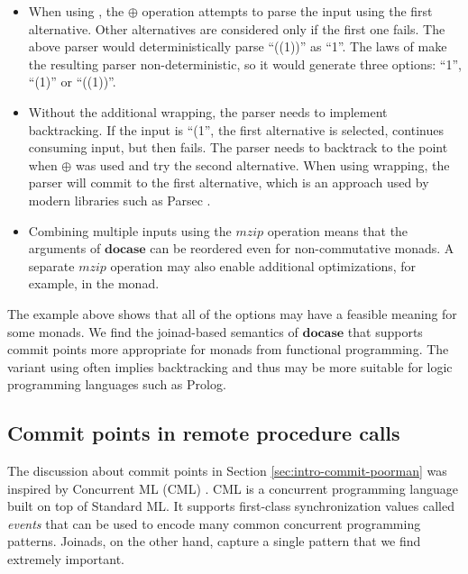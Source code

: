\documentclass{sigplanconf}
\newcommand{\Varid}[1]{\mathit{#1}}
\begin{document}
\begin{itemize}
\item When using , the \ensuremath{\oplus} operation attempts to parse the input using the
  first alternative. Other alternatives are considered only if the first one fails. The above parser 
  would deterministically parse ``((1))'' as ``1''. The laws of  make the resulting 
  parser non-deterministic, so it would generate three options: ``1'', ``(1)'' or ``((1))''.

\item Without the additional wrapping, the parser needs to implement backtracking. If the
  input is ``(1'', the first alternative is selected, continues consuming input, but then fails.
  The parser needs to backtrack to the point when \ensuremath{\oplus} was used and try the second alternative. 
  When using wrapping, the parser will commit to the first alternative, which is an approach used
  by modern libraries such as Parsec \cite{parsec}.

\item Combining multiple inputs using the \ensuremath{\Varid{mzip}} operation means that the arguments of \ensuremath{\mathbf{docase}}
  can be reordered even for non-commutative monads. A separate \ensuremath{\Varid{mzip}} operation may also enable 
  additional optimizations, for example, in the  monad.

\end{itemize}
The example above shows that all of the options may have a feasible meaning for some monads. We find 
the joinad-based semantics of \ensuremath{\mathbf{docase}} that supports commit points more appropriate for monads from 
functional programming. The variant using  often implies backtracking and thus may 
be more suitable for logic programming languages such as Prolog. 


\subsection{Commit points in remote procedure calls}
The discussion about commit points in Section \ref{sec:intro-commit-poorman} was inspired by 
Concurrent ML (CML) \cite{concurrentml}. CML is a concurrent programming language built on top
of Standard ML. It supports first-class synchronization values called \textit{events} that can 
be used to encode many common concurrent programming patterns. Joinads, on the other hand, capture 
a single pattern that we find extremely important. 
\end{document}
